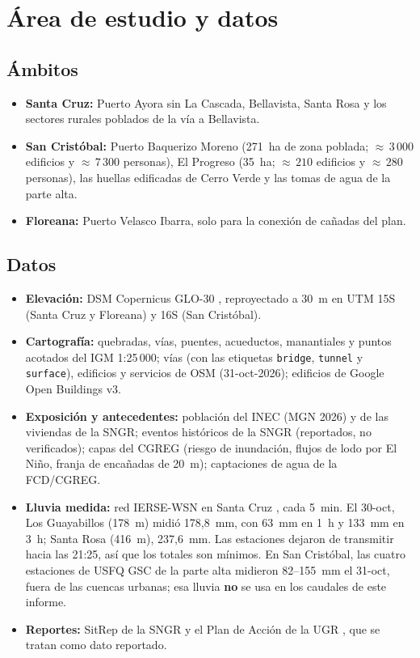 \documentclass{sosg-informe}
\begin{document}
\section{Área de estudio y datos}

\subsection{Ámbitos}
\begin{itemize}
  \item \textbf{Santa Cruz:} Puerto Ayora sin La Cascada, Bellavista, Santa Rosa y los sectores rurales poblados de la vía a Bellavista.
  \item \textbf{San Cristóbal:} Puerto Baquerizo Moreno (271~ha de zona poblada; ${\approx}\,3\,000$ edificios y ${\approx}\,7\,300$ personas), El Progreso (35~ha; ${\approx}\,210$ edificios y ${\approx}\,280$ personas), las huellas edificadas de Cerro Verde y las tomas de agua de la parte alta.
  \item \textbf{Floreana:} Puerto Velasco Ibarra, solo para la conexión de cañadas del plan.
\end{itemize}

\subsection{Datos}
\begin{itemize}
  \item \textbf{Elevación:} DSM Copernicus GLO-30 \citep{esa2021}, reproyectado a 30~m en UTM 15S (Santa Cruz y Floreana) y 16S (San Cristóbal).
  \item \textbf{Cartografía:} quebradas, vías, puentes, acueductos, manantiales y puntos acotados del IGM 1:25\,000; vías (con las etiquetas \texttt{bridge}, \texttt{tunnel} y \texttt{surface}), edificios y servicios de OSM (31-oct-2026); edificios de Google Open Buildings v3.
  \item \textbf{Exposición y antecedentes:} población del INEC (MGN 2026) y de las viviendas de la SNGR; eventos históricos de la SNGR (reportados, no verificados); capas del CGREG (riesgo de inundación, flujos de lodo por El Niño, franja de encañadas de 20~m); captaciones de agua de la FCD/CGREG.
  \item \textbf{Lluvia medida:} red IERSE-WSN en Santa Cruz \citep{ierse2026}, cada 5~min. El 30-oct, Los Guayabillos (178~m) midió 178,8~mm, con 63~mm en 1~h y 133~mm en 3~h; Santa Rosa (416~m), 237,6~mm. Las estaciones dejaron de transmitir hacia las 21:25, así que los totales son mínimos. En San Cristóbal, las cuatro estaciones de USFQ GSC de la parte alta \citep{gsc2026} midieron 82--155~mm el 31-oct, fuera de las cuencas urbanas; esa lluvia \textbf{no} se usa en los caudales de este informe.
  \item \textbf{Reportes:} SitRep de la SNGR \citep{sngr2026sitrep,sngr2023} y el Plan de Acción de la UGR \citep{ugr2026}, que se tratan como dato reportado.
\end{itemize}
\end{document}
